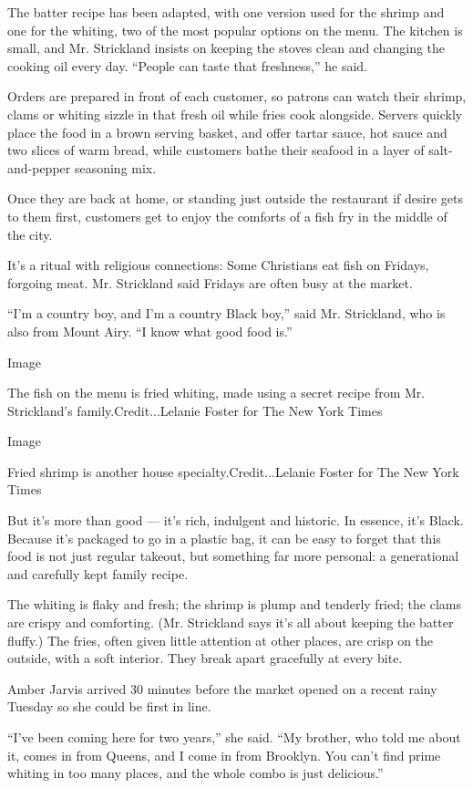 The batter recipe has been adapted, with one version used for the shrimp
and one for the whiting, two of the most popular options on the menu.
The kitchen is small, and Mr. Strickland insists on keeping the stoves
clean and changing the cooking oil every day. ``People can taste that
freshness,'' he said.

Orders are prepared in front of each customer, so patrons can watch
their shrimp, clams or whiting sizzle in that fresh oil while fries cook
alongside. Servers quickly place the food in a brown serving basket, and
offer tartar sauce, hot sauce and two slices of warm bread, while
customers bathe their seafood in a layer of salt-and-pepper seasoning
mix.

Once they are back at home, or standing just outside the restaurant if
desire gets to them first, customers get to enjoy the comforts of a fish
fry in the middle of the city.

It's a ritual with religious connections: Some Christians eat fish on
Fridays, forgoing meat. Mr. Strickland said Fridays are often busy at
the market.

``I'm a country boy, and I'm a country Black boy,'' said Mr. Strickland,
who is also from Mount Airy. ``I know what good food is.''

Image

The fish on the menu is fried whiting, made using a secret recipe from
Mr. Strickland's family.Credit...Lelanie Foster for The New York Times

Image

Fried shrimp is another house specialty.Credit...Lelanie Foster for The
New York Times

But it's more than good --- it's rich, indulgent and historic. In
essence, it's Black. Because it's packaged to go in a plastic bag, it
can be easy to forget that this food is not just regular takeout, but
something far more personal: a generational and carefully kept family
recipe.

The whiting is flaky and fresh; the shrimp is plump and tenderly fried;
the clams are crispy and comforting. (Mr. Strickland says it's all about
keeping the batter fluffy.) The fries, often given little attention at
other places, are crisp on the outside, with a soft interior. They break
apart gracefully at every bite.

Amber Jarvis arrived 30 minutes before the market opened on a recent
rainy Tuesday so she could be first in line.

``I've been coming here for two years,'' she said. ``My brother, who
told me about it, comes in from Queens, and I come in from Brooklyn. You
can't find prime whiting in too many places, and the whole combo is just
delicious.''

